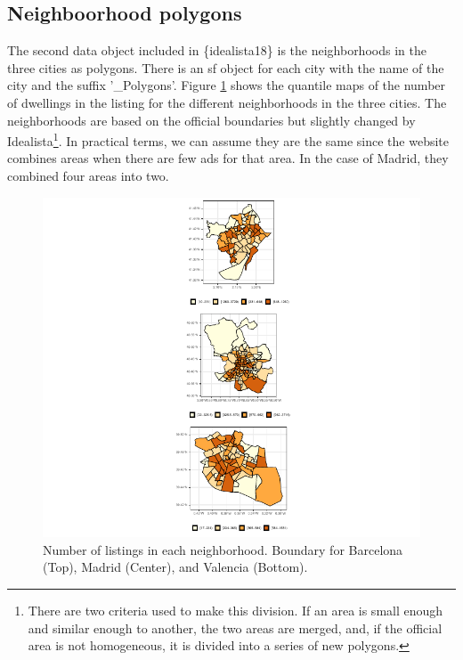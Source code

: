 \documentclass[Royal,times,sageh]{sagej}
\begin{document}
\hypertarget{neighboorhood-polygons}{%
\subsection{Neighboorhood polygons}\label{neighboorhood-polygons}}

The second data object included in \{idealista18\} is the neighborhoods
in the three cities as polygons. There is an sf object for each city
with the name of the city and the suffix '\_Polygons'. Figure
\ref{fig:all-polygons} shows the quantile maps of the number of
dwellings in the listing for the different neighborhoods in the three
cities. The neighborhoods are based on the official boundaries but
slightly changed by
Idealista\footnote{There are two criteria used to make this division. If an area is small enough and similar enough to another, the two areas are merged, and, if the official area is not homogeneous, it is divided into a series of new polygons.}.
In practical terms, we can assume they are the same since the website
combines areas when there are few ads for that area. In the case of
Madrid, they combined four areas into two.

\begin{figure}
\centering
\includegraphics{main_EPB_files/figure-latex/unnamed-chunk-1-1.pdf}
\caption{\label{fig:all-polygons}Number of listings in each
neighborhood. Boundary for Barcelona (Top), Madrid (Center), and
Valencia (Bottom).}
\end{figure}
\end{document}
